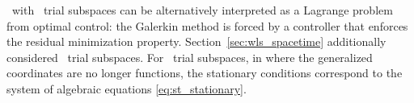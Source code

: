 \methodAcronym\ with \spatialAcronym\ trial subspaces can be alternatively interpreted as a Lagrange problem from optimal control: the Galerkin method is forced by a 
controller that enforces the residual minimization property. 
Section~\ref{sec:wls_spacetime} additionally considered \spaceTimeAcronym\
trial subspaces. For \spaceTimeAcronym\ trial subspaces, in where the
generalized coordinates are no longer functions, the stationary conditions
correspond to the system of algebraic equations \eqref{eq:st_stationary}.
